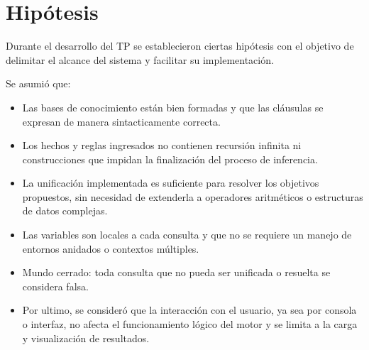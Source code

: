 \section{Hipótesis}

Durante el desarrollo del TP se establecieron ciertas hipótesis con el objetivo de delimitar el alcance del sistema y facilitar su implementación. 

Se asumió que:
\begin{itemize}
    \item Las bases de conocimiento están bien formadas y que las cláusulas se expresan de manera sintacticamente correcta.
    \item Los hechos y reglas ingresados no contienen recursión infinita ni construcciones que impidan la finalización del proceso de inferencia.
    \item La unificación implementada es suficiente para resolver los objetivos propuestos, sin necesidad de extenderla a operadores aritméticos o estructuras de datos complejas.
    \item Las variables son locales a cada consulta y que no se requiere un manejo de entornos anidados o contextos múltiples.
    \item Mundo cerrado: toda consulta que no pueda ser unificada o resuelta se considera falsa.
    \item Por ultimo, se consideró que la interacción con el usuario, ya sea por consola o interfaz, no afecta el funcionamiento lógico del motor y se limita a la carga y visualización de resultados.
    
\end{itemize}